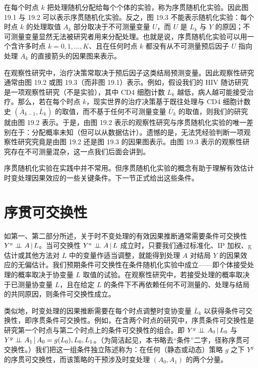 在每个时点 $k$ 把处理随机分配给每个个体的实验，称为序贯随机化实验。因此图 19.1 与 19.2 可以表示序贯随机化实验。反之，图 19.3 不能表示随机化实验：每个时点 $k$ 的处理取值 $A_k$ 部分取决于不可测量变量 $U$，而 $U$ 是 $L_k$ 与 $Y$ 的原因；不可测量变量显然无法被研究者用来分配处理。也就是说，序贯随机化实验可以用一个含许多时点 $k=0,1,\ldots,K$、且在任何时点 $k$ 都没有从不可测量预后因子 $U$ 指向处理 $A_k$ 的直接箭头的因果图来表示。

在观察性研究中，治疗决策常取决于预后因子这类结局预测变量。因此观察性研究通常由图 19.2 或图 19.3（而非图 19.1）表示。例如，假设我们的 HIV 随访研究是一项观察性研究（不是实验），其中 CD4 细胞计数 $L_k$ 越低，病人越可能接受治疗。那么，若在每个时点 $k$，现实世界的治疗决策基于既往处理与 CD4 细胞计数史 $(\bar{A}_{k-1},\bar{L}_k)$ 的取值，而不基于任何不可测量变量 $\bar{U}_k$ 的取值，则我们的研究就由图 19.2 表示。于是，由图 19.2 表示的观察性研究与序贯随机化实验的唯一差别在于：分配概率未知（但可以从数据估计）。遗憾的是，无法凭经验判断一项观察性研究究竟是由图 19.2 还是图 19.3 的因果图表示。由图 19.3 表示的观察性研究存在不可测量混杂，这一点我们后面会讲到。

序贯随机化实验在实践中并不常用。但序贯随机化实验的概念有助于理解有效估计时变处理因果效应的一些关键条件。下一节正式给出这些条件。

\section{序贯可交换性}

如第一、第二部分所述，关于时不变处理的有效因果推断通常需要条件可交换性 $Y^a\perp\!\!\!\perp A\,|\, L$。当可交换性 $Y^a\perp\!\!\!\perp A\,|\, L$ 成立时，只要我们通过标准化、IP 加权、g 估计或其他方法对 $L$ 中的变量作适当调整，就能得到处理 $A$ 对结局 $Y$ 的因果效应的无偏估计。我们预期条件可交换性在条件随机化实验中成立——即个体接受处理的概率取决于协变量 $L$ 取值的试验。在观察性研究中，若接受处理的概率取决于已测量协变量 $L$，且在给定 $L$ 的条件下不再依赖任何不可测量的、处理与结局的共同原因，则条件可交换性成立。

类似地，时变处理的因果推断需要在每个时点调整时变协变量 $\bar{L}_k$ 以获得条件可交换性，即序贯条件可交换性。例如，在含两个时点的研究中，序贯条件可交换性是研究第一个时点与第二个时点上的条件可交换性的组合。即 $Y^g\perp\!\!\!\perp A_0\,|\, L_0$ 与 $Y^g\perp\!\!\!\perp A_1\,|\, A_0=g(L_0),L_0,L_1$。（为简洁起见，本书略去“条件”二字，径称序贯可交换性。）我们把这一组条件独立陈述称为：在任何（静态或动态）策略 $g$ 之下 $Y^g$ 的序贯可交换性，而该策略的干预涉及时变处理 $(A_0,A_1)$ 的两个分量。

